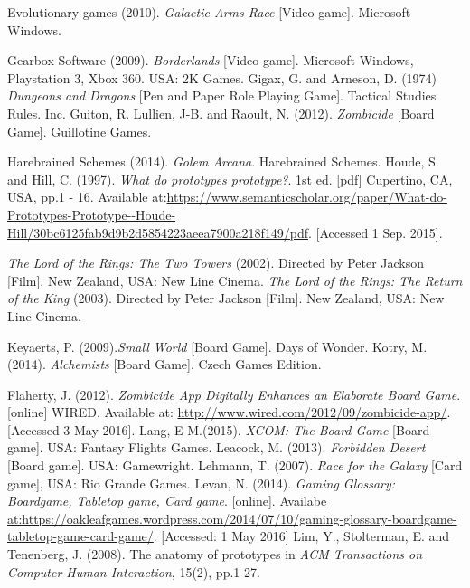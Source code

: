 \documentclass[a4paper,11pt]{report}
\begin{document}
\begin{thebibliography}{1}
Evolutionary games (2010). \textit{Galactic Arms Race} [Video game]. Microsoft Windows. 


Gearbox Software (2009). \textit{Borderlands} [Video game]. Microsoft Windows, Playstation 3, Xbox 360. USA: 2K Games.
Gigax, G. and Arneson, D. (1974) \textit{Dungeons and Dragons} [Pen and Paper Role Playing Game]. Tactical Studies Rules. Inc.
Guiton, R. Lullien, J-B. and Raoult, N. (2012). \textit{Zombicide} [Board Game]. Guillotine Games.

Harebrained Schemes (2014). \textit{Golem Arcana}. Harebrained Schemes.
Houde, S. and Hill, C. (1997). \textit{What do prototypes prototype?}. 1st ed. [pdf] Cupertino, CA, USA, pp.1 - 16. Available at:\url{https://www.semanticscholar.org/paper/What-do-Prototypes-Prototype--Houde-Hill/30bc6125fab9d9b2d5854223aeea7900a218f149/pdf}. [Accessed 1 Sep. 2015].

\textit{The Lord of the Rings: The Two Towers} (2002). Directed by Peter Jackson [Film]. New Zealand, USA: New Line Cinema.
\textit{The Lord of the Rings: The Return of the King} (2003). Directed by Peter Jackson [Film]. New Zealand, USA: New Line Cinema.


Keyaerts, P. (2009).\textit{Small World} [Board Game]. Days of Wonder.
Kotry, M. (2014). \textit{Alchemists} [Board Game]. Czech Games Edition.

Flaherty, J. (2012). \textit{Zombicide App Digitally Enhances an Elaborate Board Game}. [online] WIRED. Available at: \url{http://www.wired.com/2012/09/zombicide-app/}. [Accessed 3 May 2016].
Lang, E-M.(2015). \textit{XCOM: The Board Game} [Board game]. USA: Fantasy Flights Games.
Leacock, M. (2013). \textit{Forbidden Desert} [Board game]. USA: Gamewright.
Lehmann, T. (2007). \textit{Race for the Galaxy} [Card game], USA: Rio Grande Games.
Levan, N. (2014). \textit{Gaming Glossary: Boardgame, Tabletop game, Card game}. [online]. \url{Availabe at:https://oakleafgames.wordpress.com/2014/07/10/gaming-glossary-boardgame-tabletop-game-card-game/}. [Accessed: 1 May 2016]
Lim, Y., Stolterman, E. and Tenenberg, J. (2008). The anatomy of prototypes in \textit{ACM Transactions on Computer-Human Interaction}, 15(2), pp.1-27.


\end{thebibliography}
\end{document}
